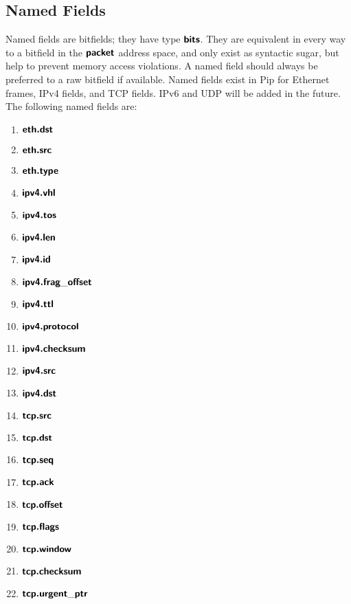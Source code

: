 \subsection{Named Fields}
Named fields are bitfields; they have type $\bm{\mathsf{{bits}}}$. They are equivalent in every way to a bitfield in the $\bm{\mathsf{{packet}}}$ address space, and only exist as syntactic sugar, but help to prevent memory access violations. A named field should always be preferred to a raw bitfield if available. Named fields exist in Pip for Ethernet frames, IPv4 fields, and TCP fields. IPv6 and UDP will be added in the future. The following named fields are:
\begin{enumerate}
  \item $\bm{\mathsf{{eth.dst}}}$ 
  \item $\bm{\mathsf{{eth.src}}}$
  \item $\bm{\mathsf{{eth.type}}}$
  \item $\bm{\mathsf{{ipv4.vhl}}}$
  \item $\bm{\mathsf{{ipv4.tos}}}$
  \item $\bm{\mathsf{{ipv4.len}}}$
  \item $\bm{\mathsf{{ipv4.id}}}$
  \item $\bm{\mathsf{{ipv4.frag\_offset}}}$
  \item $\bm{\mathsf{{ipv4.ttl}}}$
  \item $\bm{\mathsf{{ipv4.protocol}}}$
  \item $\bm{\mathsf{{ipv4.checksum}}}$
  \item $\bm{\mathsf{{ipv4.src}}}$
  \item $\bm{\mathsf{{ipv4.dst}}}$
  \item $\bm{\mathsf{{tcp.src}}}$
  \item $\bm{\mathsf{{tcp.dst}}}$
  \item $\bm{\mathsf{{tcp.seq}}}$
  \item $\bm{\mathsf{{tcp.ack}}}$
  \item $\bm{\mathsf{{tcp.offset}}}$
  \item $\bm{\mathsf{{tcp.flags}}}$
  \item $\bm{\mathsf{{tcp.window}}}$
  \item $\bm{\mathsf{{tcp.checksum}}}$
  \item $\bm{\mathsf{{tcp.urgent\_ptr}}}$
\end{enumerate}
